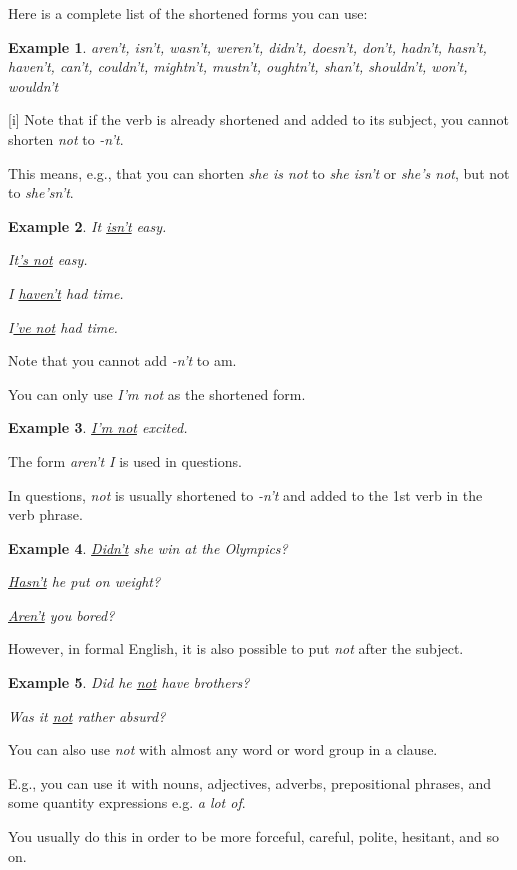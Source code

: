 \documentclass[oneside]{book}
\numberwithin{equation}{section}
\newtheorem{example}{Example}[section]
\begin{document}
%
Here is a complete list of the shortened forms you can use:
\begin{example}
    aren't, isn't, wasn't, weren't, didn't, doesn't, don't, hadn't, hasn't, haven't, can't, couldn't, mightn't, mustn't, oughtn't, shan't, shouldn't, won't, wouldn't
\end{example}
%
\noindent{} [i] Note that if the verb is already shortened and added to its subject, you cannot shorten \textit{not} to \textit{-n't}.

This means, e.g., that you can shorten \textit{she is not} to \textit{she isn't} or \textit{she's not}, but not to \textit{she'sn't}.
\begin{example}
    It \underline{isn't} easy.
    
    It\underline{'s not} easy.
    
    I \underline{haven't} had time.
    
    I\underline{'ve not} had time.
\end{example}
Note that you cannot add \textit{-n't} to am.

You can only use \textit{I'm not} as the shortened form.
\begin{example}
    \underline{I'm not} excited.
\end{example}
The form \textit{aren't I} is used in questions.

%
In questions, \textit{not} is usually shortened to \textit{-n't} and added to the 1st verb in the verb phrase.
\begin{example}
    \underline{Didn't} she win at the Olympics?
    
    \underline{Hasn't} he put on weight?
    
    \underline{Aren't} you bored?
\end{example}
However, in formal English, it is also possible to put \textit{not} after the subject.
\begin{example}
    Did he \underline{not} have brothers?
    
    Was it \underline{not} rather absurd?
\end{example}
%
\noindent{} You can also use \textit{not} with almost any word or word group in a clause.

E.g., you can use it with nouns, adjectives, adverbs, prepositional phrases, and some quantity expressions e.g. \textit{a lot of}.

You usually do this in order to be more forceful, careful, polite, hesitant, and so on.
\end{document}
